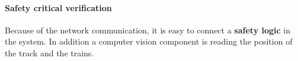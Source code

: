 \paragraph{Safety critical verification}
Because of the network communication, it is easy to connect a \textbf{safety logic} in the system. In addition a computer vision component is reading the position of the track and the trains. 
